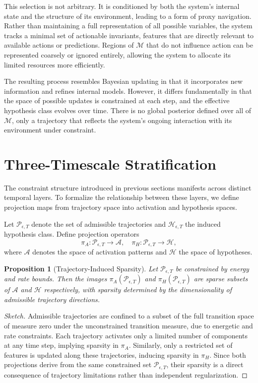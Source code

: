 \documentclass[12pt]{article}
\theoremstyle{plain}
\newtheorem{proposition}[theorem]{Proposition}
\theoremstyle{definition}
\theoremstyle{remark}
\begin{document}
This selection is not arbitrary. It is conditioned by both the system's internal state and the structure of its environment, leading to a form of proxy navigation. Rather than maintaining a full representation of all possible variables, the system tracks a minimal set of actionable invariants, features that are directly relevant to available actions or predictions. Regions of $\mathcal{M}$ that do not influence action can be represented coarsely or ignored entirely, allowing the system to allocate its limited resources more efficiently.

The resulting process resembles Bayesian updating in that it incorporates new information and refines internal models. However, it differs fundamentally in that the space of possible updates is constrained at each step, and the effective hypothesis class evolves over time. There is no global posterior defined over all of $\mathcal{M}$, only a trajectory that reflects the system's ongoing interaction with its environment under constraint.

\section{Three-Timescale Stratification}

The constraint structure introduced in previous sections manifests across distinct temporal layers. To formalize the relationship between these layers, we define projection maps from trajectory space into activation and hypothesis spaces.

Let $\mathcal{P}_{\epsilon,T}$ denote the set of admissible trajectories and $\mathcal{H}_{\epsilon,T}$ the induced hypothesis class. Define projection operators
\[
\pi_A : \mathcal{P}_{\epsilon,T} \to \mathcal{A}, \quad \pi_H : \mathcal{P}_{\epsilon,T} \to \mathcal{H},
\]
where $\mathcal{A}$ denotes the space of activation patterns and $\mathcal{H}$ the space of hypotheses.

\begin{proposition}[Trajectory-Induced Sparsity]
Let $\mathcal{P}_{\epsilon,T}$ be constrained by energy and rate bounds. Then the images $\pi_A(\mathcal{P}_{\epsilon,T})$ and $\pi_H(\mathcal{P}_{\epsilon,T})$ are sparse subsets of $\mathcal{A}$ and $\mathcal{H}$ respectively, with sparsity determined by the dimensionality of admissible trajectory directions.
\end{proposition}

\begin{proof}[Sketch]
Admissible trajectories are confined to a subset of the full transition space of measure zero under the unconstrained transition measure, due to energetic and rate constraints. Each trajectory activates only a limited number of components at any time step, implying sparsity in $\pi_A$. Similarly, only a restricted set of features is updated along these trajectories, inducing sparsity in $\pi_H$. Since both projections derive from the same constrained set $\mathcal{P}_{\epsilon,T}$, their sparsity is a direct consequence of trajectory limitations rather than independent regularization.
\end{proof}
\end{document}
